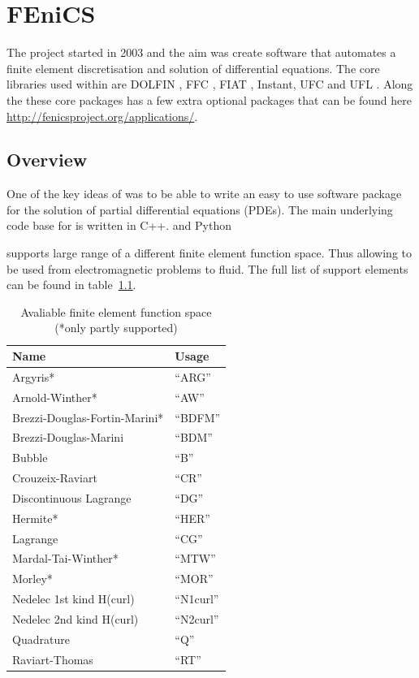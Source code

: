 \chapter{FEniCS}

The \fenics project started in 2003 and the aim was create software that automates a finite element discretisation and solution of differential equations. The core libraries used within \fenics are DOLFIN \cite{LoggWells2010a,LoggWellsEtAl2012a}, FFC \cite{KirbyLogg2006a,LoggOlgaardEtAl2012a,OlgaardWells2010b}, FIAT \cite{Kirby2012a,Kirby2004a}, Instant, UFC \cite{AlnaesLoggEtAl2009a,AlnaesLoggEtAl2012a} and UFL \cite{AlnaesEtAl2012,Alnaes2012a}. Along the these core packages \fenics has a few extra optional packages that can be found here \url{http://fenicsproject.org/applications/}.

\section{Overview}

One of the key ideas of \fenics was to be able to write an easy to use software package for the solution of partial differential equations (PDEs). The main underlying code base for \fenics is written in C++. and Python


\fenics supports large range of a different finite element function space. Thus allowing \fenics to be used from electromagnetic problems to fluid. The full list of support elements can be found in table~\ref{tab:FunctionSpace}.
\begin{table}[h!]
    \begin{center}
        \begin{tabular}{ l  l }
            Name    &Usage\\
            \hline
            Argyris*    &``ARG''\\
            Arnold-Winther* &``AW''\\
            Brezzi-Douglas-Fortin-Marini*   &``BDFM''\\
            Brezzi-Douglas-Marini   &``BDM''\\
            Bubble  &``B''\\
            Crouzeix-Raviart    &``CR''\\
            Discontinuous Lagrange  &``DG''\\
            Hermite*    &``HER''\\
            Lagrange    &``CG''\\
            Mardal-Tai-Winther* &``MTW''\\
            Morley* &``MOR''\\
            Nedelec 1st kind H(curl)    &``N1curl''\\
            Nedelec 2nd kind H(curl)    &``N2curl''\\
            Quadrature  &``Q''\\
            Raviart-Thomas  &``RT''
        \end{tabular}
        \caption{Avaliable finite element function space (*only partly supported)}
        \label{tab:FunctionSpace}
    \end{center}
\end{table}



